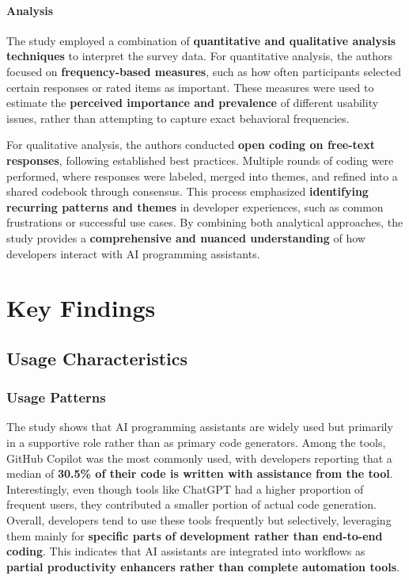 \paragraph{Analysis}
The study employed a combination of \textbf{quantitative and qualitative analysis techniques} to interpret the survey data. For quantitative analysis, the authors focused on \textbf{frequency-based measures}, such as how often participants selected certain responses or rated items as important. These measures were used to estimate the \textbf{perceived importance and prevalence} of different usability issues, rather than attempting to capture exact behavioral frequencies.

For qualitative analysis, the authors conducted \textbf{open coding on free-text responses}, following established best practices. Multiple rounds of coding were performed, where responses were labeled, merged into themes, and refined into a shared codebook through consensus. This process emphasized \textbf{identifying recurring patterns and themes} in developer experiences, such as common frustrations or successful use cases. By combining both analytical approaches, the study provides a \textbf{comprehensive and nuanced understanding} of how developers interact with AI programming assistants.

\section{Key Findings}
\subsection{Usage Characteristics}
\subsubsection{Usage Patterns}
The study shows that AI programming assistants are widely used but primarily in a supportive role rather than as primary code generators. Among the tools, GitHub Copilot was the most commonly used, with developers reporting that a median of \textbf{30.5\% of their code is written with assistance from the tool}. Interestingly, even though tools like ChatGPT had a higher proportion of frequent users, they contributed a smaller portion of actual code generation. Overall, developers tend to use these tools frequently but selectively, leveraging them mainly for \textbf{specific parts of development rather than end-to-end coding}. This indicates that AI assistants are integrated into workflows as \textbf{partial productivity enhancers rather than complete automation tools}.

